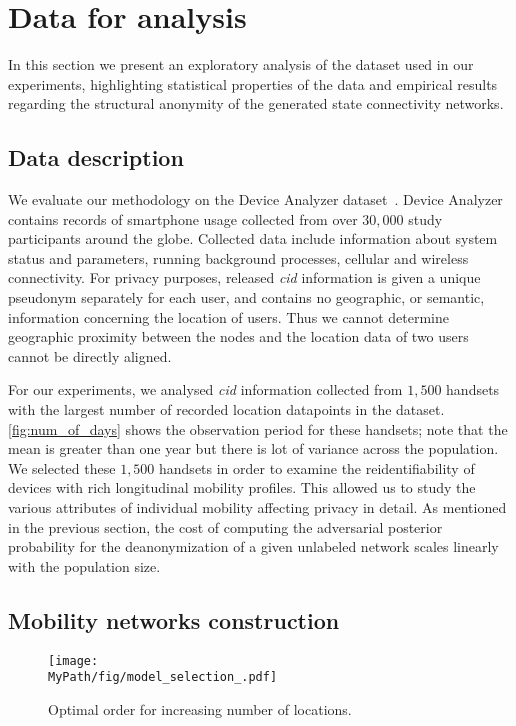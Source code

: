 \section{Data for analysis}

In this section we present an exploratory analysis of the dataset used in our experiments, highlighting statistical properties of the data and empirical results regarding the structural anonymity of the generated state connectivity networks.

\subsection{Data description}

We evaluate our methodology on the Device Analyzer dataset~\citep{Wagner2014}. Device Analyzer contains records of smartphone usage collected from over $ 30,000 $  study participants around the globe.
Collected data include information about system status and parameters, running background processes, cellular and wireless connectivity.
For privacy purposes, released \emph{cid} information is given a unique pseudonym separately for each user, and contains no geographic, or semantic, information concerning the location of users.
Thus we cannot determine geographic proximity between the nodes and the location data of two users cannot be directly aligned.

For our experiments, we analysed \emph{cid} information collected from $1,500$ handsets with the largest number of recorded location datapoints in the dataset.
\cref{fig:num_of_days} shows the observation period for these handsets; note that the mean is greater than one year but there is lot of variance across the population.
We selected these $1,500$ handsets in order to examine the reidentifiability of devices with rich longitudinal mobility profiles.
This allowed us to study the various attributes of individual mobility affecting privacy in detail.
As mentioned in the previous section, the cost of computing the adversarial posterior probability for the deanonymization of a given unlabeled network scales linearly with the population size.

\subsection{Mobility networks construction\label{sec:mobility-net-construct}}

\begin{figure*}[t]
	\centering
	\texttt{[image: \\MyPath/fig/model\_selection\_.pdf]}
	\caption{{Optimal order for increasing number of locations.}}
	\label{fig:model_selection}
\end{figure*}

